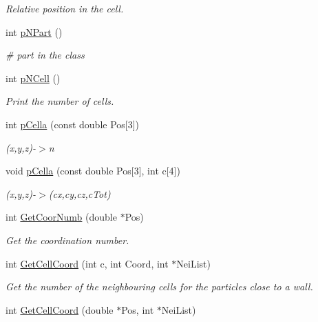 \begin{DoxyCompactItemize}
\begin{DoxyCompactList}\small\item\em \-Relative position in the cell. \end{DoxyCompactList}\item 
int \hyperlink{classDomDecBasics_a388622b5e7d2ad20e8ac1a8a951d655f}{p\-N\-Part} ()
\begin{DoxyCompactList}\small\item\em \# part in the class \end{DoxyCompactList}\item 
int \hyperlink{classDomDecBasics_a02631cacc3cd393a64b7e78df3734e48}{p\-N\-Cell} ()
\begin{DoxyCompactList}\small\item\em \-Print the number of cells. \end{DoxyCompactList}\item 
int \hyperlink{classDomDecBasics_a8bc667d6b3e872a9cabbb54f1eb671e8}{p\-Cella} (const double \-Pos\mbox{[}3\mbox{]})
\begin{DoxyCompactList}\small\item\em (x,y,z)-\/$>$n \end{DoxyCompactList}\item 
void \hyperlink{classDomDecBasics_a328df10e55925d98bc8ca3daa5ca4f96}{p\-Cella} (const double \-Pos\mbox{[}3\mbox{]}, int c\mbox{[}4\mbox{]})
\begin{DoxyCompactList}\small\item\em (x,y,z)-\/$>$(cx,cy,cz,c\-Tot) \end{DoxyCompactList}\item 
int \hyperlink{classDomDecBasics_a14d68ab6ae97b1ddd6c8a56ec9607f87}{\-Get\-Coor\-Numb} (double $\ast$\-Pos)
\begin{DoxyCompactList}\small\item\em \-Get the coordination number. \end{DoxyCompactList}\item 
int \hyperlink{classDomDecBasics_a99b8d5719387a53ac431da0b85694056}{\-Get\-Cell\-Coord} (int c, int \-Coord, int $\ast$\-Nei\-List)
\begin{DoxyCompactList}\small\item\em \-Get the number of the neighbouring cells for the particles close to a wall. \end{DoxyCompactList}\item 
int \hyperlink{classDomDecBasics_af2721958380b0ab29aed010a01b93ab8}{\-Get\-Cell\-Coord} (double $\ast$\-Pos, int $\ast$\-Nei\-List)

\end{DoxyCompactItemize}
